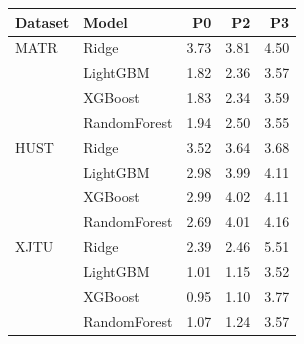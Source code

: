 \begin{tabular}{llrrr}
\toprule
Dataset & Model & P0 & P2 & P3 \\
\midrule
MATR & Ridge & 3.73 & 3.81 & 4.50 \\
 & LightGBM & 1.82 & 2.36 & 3.57 \\
 & XGBoost & 1.83 & 2.34 & 3.59 \\
 & RandomForest & 1.94 & 2.50 & 3.55 \\
HUST & Ridge & 3.52 & 3.64 & 3.68 \\
 & LightGBM & 2.98 & 3.99 & 4.11 \\
 & XGBoost & 2.99 & 4.02 & 4.11 \\
 & RandomForest & 2.69 & 4.01 & 4.16 \\
XJTU & Ridge & 2.39 & 2.46 & 5.51 \\
 & LightGBM & 1.01 & 1.15 & 3.52 \\
 & XGBoost & 0.95 & 1.10 & 3.77 \\
 & RandomForest & 1.07 & 1.24 & 3.57 \\
\bottomrule
\end{tabular}
